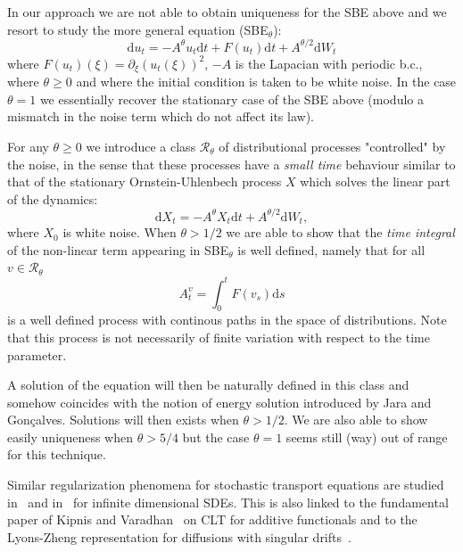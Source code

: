 \documentclass[11pt,a4paper,draft,reqno]{amsart}
\newcommand{\dd}{\mathrm{d}}
\begin{document}
In our approach we are not able to obtain uniqueness for the SBE above and  we resort to study the more general equation (SBE$_\theta$):
\begin{equation}
\label{eq:burgers-theta}
\dd u_t = - A^\theta u_t \dd t + F(u_t) \dd t + A^{\theta/2} \dd W_t 
\end{equation}
where $F(u_t)(\xi)=\partial_\xi (u_t(\xi))^2$, $-A$ is the Lapacian with periodic b.c.{\color{red},} where $\theta\ge 0$ and where the initial condition is taken to be white noise. In the case $\theta=1$ we essentially recover the stationary case of the SBE above (modulo a mismatch in the noise term which do not affect its law). 

For any $\theta \ge 0$ we introduce a class $\mathcal{R}_\theta$ of distributional processes "controlled" by the noise, in the sense that these processes have a  \emph{small time} behaviour similar to that of the stationary  Ornstein-Uhlenbech process $X$  which solves the linear part of the dynamics:
\begin{equation}
\label{eq:ou-theta}
\dd X_t = - A^\theta X_t \dd t + A^{\theta/2} \dd W_t,
\end{equation}
where $X_0$ is white noise.
 When $\theta > 1/2$ we are able to show that the \emph{time integral} of the non-linear term appearing in SBE$_\theta$ is well defined, namely that for all $v\in \mathcal{R}_\theta$ 
$$
A^v_t = \int_0 ^t F(v_s) \dd s
$$
is a well defined process with continous paths in the space of distributions. Note that this process is not necessarily of finite variation with respect to the time parameter. 

A solution of the equation will then be naturally defined in this class and somehow coincides with the notion of energy solution introduced by Jara and Gon\c{c}alves. Solutions will then exists when $\theta > 1/2$. We are also able to show easily uniqueness when $\theta > 5/4$ but the  case $\theta=1$ seems still (way) out of range for this technique. 

Similar regularization phenomena for stochastic transport equations are studied in~\cite{FGP} and in~\cite{DF} for infinite dimensional SDEs. This is also linked to the fundamental paper of Kipnis and Varadhan~\cite{KV} on CLT for additive functionals and to the Lyons-Zheng representation for diffusions with singular drifts~\cites{MR1988703, MR2065168}.
\end{document}
